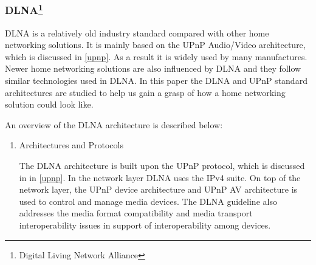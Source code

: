 \subsubsection[DLNA]{DLNA\footnote{Digital Living Network Alliance}} 
DLNA is a relatively old industry standard compared with other home networking 
solutions. It is mainly based on the UPnP Audio/Video architecture, which is 
discussed in \ref{upnp}. As a result it is widely used by many manufactures. Newer 
home networking solutions are also influenced by DLNA and they follow similar 
technologies used in DLNA. In this paper the DLNA and UPnP standard architectures are studied to help us gain a grasp of how a home networking solution could look like. 

An overview of the DLNA architecture \cite{dlna_guideline} is described below: 
\begin{enumerate} 
\item Architectures and Protocols 

\begin{table}[htb] 
\caption{Key Technology Ingredients \label{Table3}} 
\begin{center} 
\end{center} 
\end{table} 

The DLNA architecture is built upon the UPnP protocol, which is discussed in 
 in \ref{upnp}. 
In the network layer DLNA uses the IPv4 suite. On top of the network layer, the UPnP device architecture and UPnP AV architecture is used to control and manage media devices. The DLNA 
guideline also addresses the media format compatibility and media transport 
interoperability issues in support of interoperability among devices. 


\end{enumerate}
